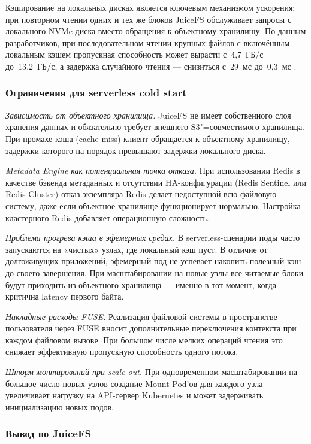Кэширование на локальных дисках является ключевым механизмом ускорения: при повторном чтении одних и тех же блоков JuiceFS обслуживает запросы с локального NVMe-диска вместо обращения к объектному хранилищу. По данным разработчиков, при последовательном чтении крупных файлов с включённым локальным кэшем пропускная способность может вырасти с~4{,}7~ГБ/с до~13{,}2~ГБ/с, а задержка случайного чтения --- снизиться с~29~мс до~0{,}3~мс \cite{juicefs_perf}.

\subsubsection*{Ограничения для serverless cold start}

\textit{Зависимость от объектного хранилища.} JuiceFS не имеет собственного слоя хранения данных и обязательно требует внешнего S3"=совместимого хранилища. При промахе кэша (cache miss) клиент обращается к объектному хранилищу, задержки которого на порядок превышают задержки локального диска.

\textit{Metadata Engine как потенциальная точка отказа.} При использовании Redis в качестве бэкенда метаданных и отсутствии HA-конфигурации (Redis Sentinel или Redis Cluster) отказ экземпляра Redis делает недоступной всю файловую систему, даже если объектное хранилище функционирует нормально. Настройка кластерного Redis добавляет операционную сложность.

\textit{Проблема прогрева кэша в эфемерных средах.} В serverless-сценарии поды часто запускаются на «чистых» узлах, где локальный кэш пуст. В отличие от долгоживущих приложений, эфемерный под не успевает накопить полезный кэш до своего завершения. При масштабировании на новые узлы все читаемые блоки будут приходить из объектного хранилища --- именно в тот момент, когда критична latency первого байта.

\textit{Накладные расходы FUSE.} Реализация файловой системы в пространстве пользователя через FUSE вносит дополнительные переключения контекста при каждом файловом вызове. При большом числе мелких операций чтения это снижает эффективную пропускную способность одного потока.

\textit{Шторм монтирований при scale-out.} При одновременном масштабировании на большое число новых узлов создание Mount Pod'ов для каждого узла увеличивает нагрузку на API-сервер Kubernetes и может задерживать инициализацию новых подов.

\subsubsection*{Вывод по JuiceFS}

